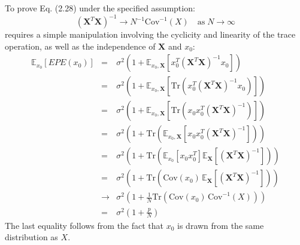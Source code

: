 To prove Eq. (2.28) under the specified assumption:
$$
(\mathbf{X}^T \mathbf{X})^{-1} \rightarrow N^{-1} \textrm{Cov}^{-1}(X) \quad \textrm{as} \; N \rightarrow \infty
$$
requires a simple manipulation involving the cyclicity and linearity of the trace operation, as well as the independence of $\mathbf{X}$ and $x_0$:
\begin{eqnarray*}
    \mathbb{E}_{x_0} \left[EPE(x_0) \right] & = &\sigma^2 \left(1 + \mathbb{E}_{x_0, 
        \mathbf{X}} \left[x_0^T (\mathbf{X}^T \mathbf{X})^{-1} x_0\right] \right) \\
    & = &\sigma^2 \left(1 + \mathbb{E}_{x_0, \mathbf{X}} \left[\textrm{Tr}\left(x_0^T 
    (\mathbf{X}^T \mathbf{X})^{-1} x_0 \right)\right] \right) \\
    & = &\sigma^2 \left(1 + \mathbb{E}_{x_0, \mathbf{X}} \left[\textrm{Tr}\left(x_0 x_0^T 
    (\mathbf{X}^T \mathbf{X})^{-1} \right)\right] \right)\\
    & = &\sigma^2 \left(1 + \textrm{Tr}\left(\mathbb{E}_{x_0, \mathbf{X}} \left[x_0 x_0^T 
    (\mathbf{X}^T \mathbf{X})^{-1} \right]\right) \right)\\
    & = &\sigma^2 \left(1 + \textrm{Tr}\left(\mathbb{E}_{x_0} \left[x_0 x_0^T \right] 
    \mathbb{E}_{\mathbf{X}}\left[ (\mathbf{X}^T \mathbf{X})^{-1} \right]\right) \right)\\
    & = &\sigma^2 \left(1 + \textrm{Tr}\left(\textrm{Cov}(x_0)\, 
    \mathbb{E}_{\mathbf{X}}\left[ (\mathbf{X}^T \mathbf{X})^{-1} \right]\right) \right)\\
    & \rightarrow &\sigma^2 \left(1 + \frac{1}{N} \textrm{Tr}\left(\textrm{Cov}(x_0)\, 
    \textrm{Cov}^{-1}(X)\right) \right)\\
    & = & \sigma^2 \left(1 + \frac{p}{N} \right)
\end{eqnarray*}
The last equality follows from the fact that $x_0$ is drawn from the same distribution 
as $X$. 